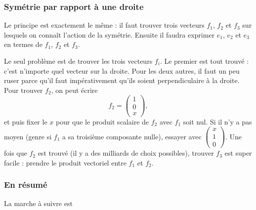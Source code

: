 \subsubsection{Symétrie par rapport à une droite}

Le principe est exactement le même : il faut trouver trois vecteurs \( f_1\), \( f_2\) et \( f_3\) sur lesquels on connaît l'action de la symétrie. Ensuite il faudra exprimer \( e_1\), \( e_2\) et \( e_3\) en termes de \( f_1\), \( f_2\) et \( f_3\).

Le seul problème est de trouver les trois vecteurs \( f_i\). Le premier est tout trouvé : c'est n'importe quel vecteur sur la droite. Pour les deux autres, il faut un peu ruser parce qu'il faut impérativement qu'ils soient perpendiculaire à la droite. Pour trouver \( f_2\), on peut écrire
\begin{equation}
	f_2=\begin{pmatrix}
		1 \\
		0 \\
		x
	\end{pmatrix},
\end{equation}
et puis fixer le \( x\) pour que le produit scalaire de \( f_2\) avec \( f_1\) soit nul. Si il n'y a pas moyen (genre si \( f_1\) a sa troisième composante nulle), essayer avec \( \begin{pmatrix}
	x \\
	1 \\
	0
\end{pmatrix}\). Une fois que \( f_2\) est trouvé (il y a des milliards de choix possibles), trouver \( f_3\) est super facile : prendre le produit vectoriel entre \( f_1\) et \( f_2\).

\subsubsection{En résumé}
La marche à suivre est

